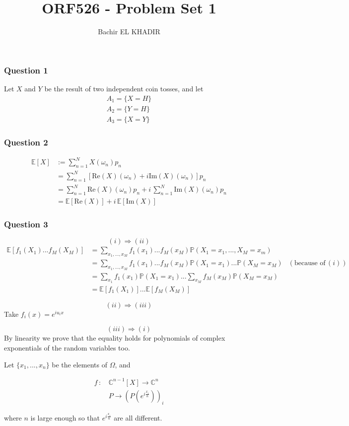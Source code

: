 \documentclass[12pt]{article}
\title{ORF526 - Problem Set 1}
\author{Bachir EL KHADIR }
\newcommand{\Q}[1]{\subsubsection*{Question #1}}
\begin{document}
\maketitle

\Q{1} 
Let $X$ and $Y$ be the result of two independent coin tosses, and let
\begin{align*}
  A_1 = \{X = H\} \\
  A_2 = \{Y = H\} \\
  A_3 = \{X = Y\} 
\end{align*}

\Q{2}
\begin{align*}
  \mathbb{E}[X]
  & := \sum_{n=1}^{N} X(\omega_n) p_n \\
  & = \sum_{n=1}^{N} \left[ \text{Re}(X)(\omega_n) + i \text{Im}(X)(\omega_n) \right] p_n \\
  & = \sum_{n=1}^{N} \text{Re}(X)(\omega_n) p_n
    + i \, \sum_{n=1}^{N}  \text{Im}(X)(\omega_n)  p_n \\
  & = \mathbb{E}[\text{Re}(X)] + i \, \mathbb{E}[\text{Im}(X)]
\end{align*}

\Q{3}

$$(i) \Rightarrow (ii)$$
\begin{align*}
  \mathbb{E}[f_1(X_1) ... f_M(X_M)]
  &= \sum_{x_1, ..., x_M} f_1(x_1) ... f_M(x_M) \mathbb{P}(X_1 = x_1, ..., X_M = x_m)\\
  &= \sum_{x_1, ..., x_M} f_1(x_1) ... f_M(x_M) \mathbb{P}(X_1 = x_1) ... \mathbb{P}(X_M = x_M) & (\text{because of} \, (i)) \\
  &= \sum_{x_1} f_1(x_1) \mathbb{P}(X_1=x_1) ... \sum_{x_M}  f_M(x_M) \mathbb{P}(X_M = x_M) \\
  &= \mathbb{E}[f_1(X_1)] ... \mathbb{E}[f_M(X_M)]
\end{align*}

$$(ii) \Rightarrow (iii)$$
Take $f_i(x) = e^{i u_i x}$

$$(iii) \Rightarrow (i)$$
By linearity we prove that the equality holds for polynomials of complex exponentials of the random variables too.

Let $\{x_1, ..., x_n\}$ be the elements of $\Omega$, and

\begin{align*}
f \, : \, &\mathbb{C}^{n-1}[X] \longrightarrow \mathbb{C}^n \\
& P \longrightarrow (P(e^{i \frac{x_i}{n}}))_i
\end{align*}

where $n$ is large enough so that $e^{i \frac{x_i}{n}}$ are all different.
\end{document}
